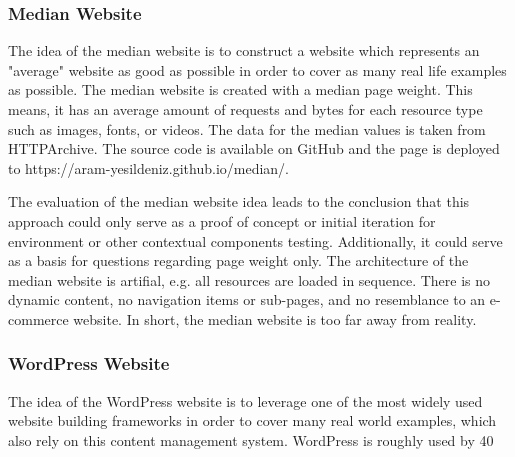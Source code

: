 
\subsubsection{Median Website}


The idea of the median website is to construct a website which represents an "average" website as good as possible in order to cover as many real life examples as possible.
The median website is created with a median page weight.
This means, it has an average amount of requests and bytes for each resource type such as images, fonts, or videos.
The data for the median values is taken from HTTPArchive. %
The source code is available on GitHub and the page is deployed to https://aram-yesildeniz.github.io/median/.


The evaluation of the median website idea leads to the conclusion that this approach could only serve as a proof of concept or initial iteration for environment or other contextual components testing.
Additionally, it could serve as a basis for questions regarding page weight only.
The architecture of the median website is artifial, e.g. all resources are loaded in sequence.
There is no dynamic content, no navigation items or sub-pages, and no resemblance to an e-commerce website.
In short, the median website is too far away from reality.






\subsubsection{WordPress Website}


The idea of the WordPress website is to leverage one of the most widely used website building frameworks in order to cover many real world examples, which also rely on this content management system.
WordPress is roughly used by 40%

